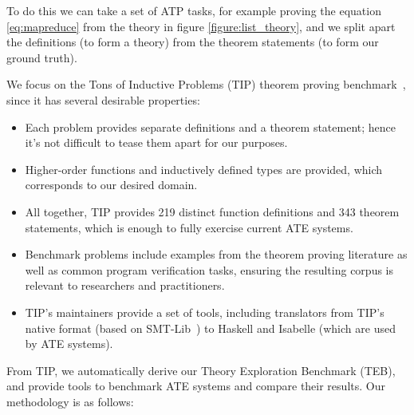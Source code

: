 To do this we can take a set of ATP tasks, for example proving the equation
\ref{eq:mapreduce} from the theory in figure \ref{figure:list_theory}, and we
split apart the definitions (to form a theory) from the theorem statements (to
form our ground truth).

We focus on the Tons of Inductive Problems (TIP) theorem proving
benchmark~\cite{claessen2015tip}, since it has several desirable properties:

\begin{itemize}
\item Each problem provides separate definitions and a theorem statement; hence
  it's not difficult to tease them apart for our purposes.
\item Higher-order functions and inductively defined types are provided, which
  corresponds to our desired domain.
\item All together, TIP provides 219 distinct function definitions and 343
  theorem statements, which is enough to fully exercise current ATE systems.
\item Benchmark problems include examples from the theorem proving literature
  as well as common program verification tasks, ensuring the resulting corpus is
  relevant to researchers and practitioners.
\item TIP's maintainers provide a set of tools, including translators from TIP's
  native format (based on SMT-Lib~\cite{BarFT-SMTLIB}) to Haskell and Isabelle
  (which are used by ATE systems).
\end{itemize}

From TIP, we automatically derive our Theory Exploration Benchmark (TEB), and
provide tools to benchmark ATE systems and compare their results. Our
methodology is as follows:

